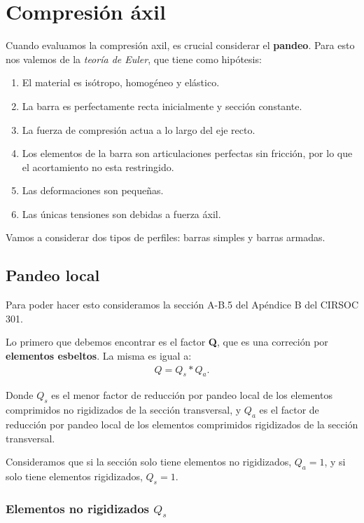 \documentclass[../main.tex]{subfiles}
\begin{document}
\section{Compresión áxil}

Cuando evaluamos la compresión axil, es crucial considerar el \textbf{pandeo}. 
Para esto nos valemos de la \textit{teoría de Euler}, que tiene como hipótesis:
\begin{enumerate}
  \item El material es isótropo, homogéneo y elástico.
  \item La barra es perfectamente recta inicialmente y sección constante.
  \item La fuerza de compresión actua a lo largo del eje recto.
  \item Los elementos de la barra son articulaciones perfectas sin fricción, por
    lo que el acortamiento no esta restringido.
  \item Las deformaciones son pequeñas.
  \item Las únicas tensiones son debidas a fuerza áxil.
\end{enumerate}

Vamos a considerar dos tipos de perfiles: barras simples y barras armadas.

\subsection{Pandeo local}

Para poder hacer esto consideramos la sección A-B.5 del Apéndice B del CIRSOC
301. 

Lo primero que debemos encontrar es el factor \textbf{Q}, que es una correción
por \textbf{elementos esbeltos}. La misma es igual a:
\begin{align*}
  Q = Q_s * Q_a
.\end{align*}

Donde $Q_s$ es el menor factor de reducción por pandeo local de los elementos 
comprimidos no rigidizados de la sección transversal, y  $Q_a$ es el factor de
reducción por pandeo local de los elementos comprimidos rigidizados de la
sección transversal.

Consideramos que si la sección solo tiene elementos no rigidizados, $Q_a=1$, y
si solo tiene elementos rigidizados,  $Q_s=1$.

\subsubsection{Elementos no rigidizados $Q_s$}
\end{document}
